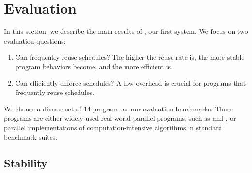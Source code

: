 \section{\tern Evaluation} \label{sec:tern-eval}
In this section, we describe the main results of \tern, our first \smt
system.  We focus on two evaluation questions:

\begin{enumerate}

\item[\S\ref{sec:tern-stable}:] Can \tern frequently reuse schedules?  The
  higher the reuse rate is, the more stable program behaviors become, and
  the more efficient \tern is.

\item[\S\ref{sec:tern-efficient}:] Can \tern efficiently enforce schedules?  A
  low overhead is crucial for programs that frequently reuse schedules.




\end{enumerate}

We choose a diverse set of 14 programs as our evaluation benchmarks.
These programs are either widely used real-world parallel programs, such
as \apache and \pbzip, or parallel
implementations of computation-intensive algorithms in standard benchmark
suites.

\subsection{Stability} \label{sec:tern-stable}

